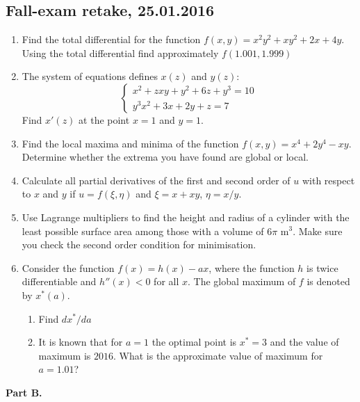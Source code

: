 \subsection{Fall-exam retake, 25.01.2016}

\begin{enumerate}

\item Find the total differential for the function $f(x,y)=x^2y^2+xy^2+2x+4y$. Using the total differential find approximately $f(1.001,1.999)$

\item The system of equations defines $x(z)$ and $y(z)$:
\begin{equation}
\begin{cases}
x^2+zxy+y^2+6z+y^3=10 \\
y^3x^2+3x+2y+z=7 \nonumber
\end{cases}
\end{equation}
Find $x'(z)$ at the point $x=1$ and $y=1$.

\item Find the local maxima and minima of the function $f(x,y)=x^4+2y^4-xy$. Determine whether the extrema you have found are global or local.


\item Calculate all partial derivatives of the first and second order of $u$ with respect to $x$ and $y$ if $u=f (\xi, \eta)$ and $\xi=x+xy$, $\eta=x/y$.

\item Use Lagrange multipliers to find the height and radius of a cylinder with the least possible
surface area among those with a volume of $6\pi$ m$^3$. Make sure you check the second order
condition for minimisation.

\item Consider the function $f(x)=h(x)-ax$, where the function $h$ is twice differentiable and $h''(x)<0$ for all $x$. The global maximum of $f$ is denoted by $x^*(a)$.
\begin{enumerate}
\item Find $dx^*/da$
\item It is known that for $a=1$ the optimal point is $x^*=3$ and the value of maximum is $2016$. What is the approximate value of maximum for $a=1.01$?
\end{enumerate}


\end{enumerate}

\textbf{Part B.}

